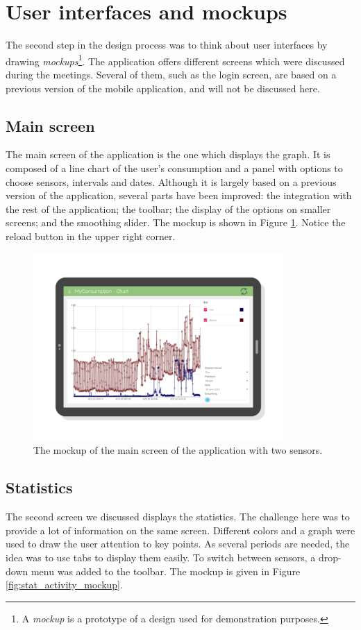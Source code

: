 \documentclass[a4paper, oneside, 11pt]{book}
\begin{document}
\section{User interfaces and mockups}
The second step in the design process was to think about user interfaces by drawing \emph{mockups}\footnote{A \emph{mockup} is a prototype of a design used for demonstration purposes.}. The application offers different screens which were discussed during the meetings. Several of them, such as the login screen, are based on a previous version of the mobile application, and will not be discussed here.

\subsection{Main screen}
The main screen of the application is the one which displays the graph. It is composed of a line chart of the user’s consumption and a panel with options to choose sensors, intervals and dates. Although it is largely based on a previous version of the application, several parts have been improved: the integration with the rest of the application; the toolbar; the display of the options on smaller screens; and the smoothing slider. The mockup is shown in Figure \ref{fig:chart_activity_mockup}. Notice the reload button in the upper right corner.

\begin{figure}[htbp]
	\centerline{\includegraphics[width=0.85\textwidth]{chart_activity_mockup.pdf}}
	\caption{The mockup of the main screen of the application with two sensors.}
	\label{fig:chart_activity_mockup}
\end{figure}

\subsection{Statistics}
The second screen we discussed displays the statistics. The challenge here was to provide a lot of information on the same screen. Different colors and a graph were used to draw the user attention to key points. As several periods are needed, the idea was to use tabs to display them easily. To switch between sensors, a drop-down menu was added to the toolbar. The mockup is given in Figure \ref{fig:stat_activity_mockup}.\\
\end{document}
